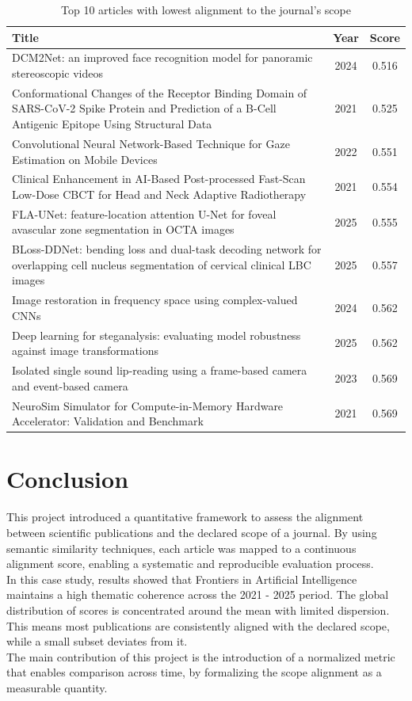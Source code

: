 \documentclass[pdflatex,sn-mathphys-num]{sn-jnl}%
\theoremstyle{thmstyleone}%
\theoremstyle{thmstyletwo}%
\theoremstyle{thmstylethree}%
\begin{document}
\begin{table}[h]
\centering
\begin{tabular}{p{10cm} c c}
\hline
\textbf{Title} & \textbf{Year} & \textbf{Score} \\
\hline
DCM2Net: an improved face recognition model for panoramic stereoscopic videos & 2024 & 0.516 \\
\hline
Conformational Changes of the Receptor Binding Domain of SARS-CoV-2 Spike Protein and Prediction of a B-Cell Antigenic Epitope Using Structural Data & 2021 & 0.525 \\
\hline
Convolutional Neural Network-Based Technique for Gaze Estimation on Mobile Devices & 2022 & 0.551 \\
\hline
Clinical Enhancement in AI-Based Post-processed Fast-Scan Low-Dose CBCT for Head and Neck Adaptive Radiotherapy & 2021 & 0.554 \\
\hline
FLA-UNet: feature-location attention U-Net for foveal avascular zone segmentation in OCTA images & 2025 & 0.555 \\
\hline
BLoss-DDNet: bending loss and dual-task decoding network for overlapping cell nucleus segmentation of cervical clinical LBC images & 2025 & 0.557 \\
\hline
Image restoration in frequency space using complex-valued CNNs & 2024 & 0.562 \\
\hline
Deep learning for steganalysis: evaluating model robustness against image transformations & 2025 & 0.562 \\
\hline
Isolated single sound lip-reading using a frame-based camera and event-based camera & 2023 & 0.569 \\
\hline
NeuroSim Simulator for Compute-in-Memory Hardware Accelerator: Validation and Benchmark & 2021 & 0.569 \\
\hline
\end{tabular}
\caption{Top 10 articles with lowest alignment to the journal's scope}
\end{table}

\newpage \section{Conclusion}\label{sec5}

This project introduced a quantitative framework to assess the alignment between scientific publications and the declared scope of a journal. By using semantic similarity techniques, each article was mapped to a continuous alignment score, enabling a systematic and reproducible evaluation process.\\
In this case study, results showed that Frontiers in Artificial Intelligence maintains a high thematic coherence across the 2021 - 2025 period. The global distribution of scores is concentrated around the mean with limited dispersion. This means most publications are consistently aligned with the declared scope, while a small subset deviates from it.\\
The main contribution of this project is the introduction of a normalized metric that enables comparison across time, by formalizing the scope alignment as a measurable quantity.\\
\end{document}
